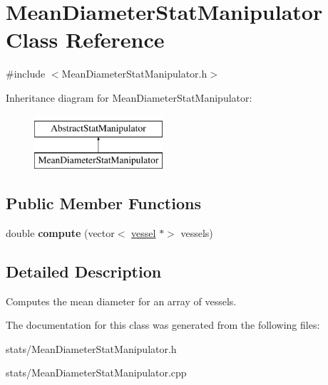 \hypertarget{class_mean_diameter_stat_manipulator}{}\section{Mean\+Diameter\+Stat\+Manipulator Class Reference}
\label{class_mean_diameter_stat_manipulator}


{\ttfamily \#include $<$Mean\+Diameter\+Stat\+Manipulator.\+h$>$}

Inheritance diagram for Mean\+Diameter\+Stat\+Manipulator\+:\begin{figure}[H]
\begin{center}
\leavevmode
\includegraphics[height=2.000000cm]{de/dc3/class_mean_diameter_stat_manipulator}
\end{center}
\end{figure}
\subsection*{Public Member Functions}
\begin{DoxyCompactItemize}
\item 
\mbox{\label{class_mean_diameter_stat_manipulator_a8376c09f92ef83440977dfbf28f022b7}} 
double {\bfseries compute} (vector$<$ \mbox{\hyperlink{structvessel}{vessel}} $\ast$$>$ vessels)
\end{DoxyCompactItemize}


\subsection{Detailed Description}
Computes the mean diameter for an array of vessels. 

The documentation for this class was generated from the following files\+:\begin{DoxyCompactItemize}
\item 
stats/Mean\+Diameter\+Stat\+Manipulator.\+h\item 
stats/Mean\+Diameter\+Stat\+Manipulator.\+cpp\end{DoxyCompactItemize}
